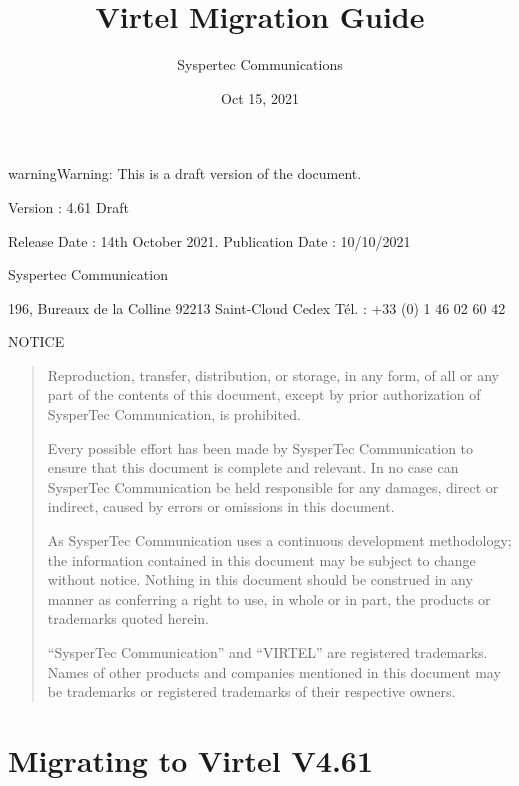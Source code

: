 \documentclass[letterpaper,10pt,english]{sphinxmanual}
\title{Virtel Migration Guide}
\date{Oct 15, 2021}
\author{Syspertec Communications}
\begin{document}
\pagestyle{empty}
\sphinxmaketitle
\pagestyle{plain}
\sphinxtableofcontents
\pagestyle{normal}
\label{\detokenize{Migration_Guide::doc}}



\begin{sphinxadmonition}{warning}{Warning:}
This is a draft version of the document.
\end{sphinxadmonition}

Version : 4.61 Draft

Release Date : 14th October 2021. Publication Date : 10/10/2021

Syspertec Communication

196, Bureaux de la Colline 92213 Saint-Cloud Cedex Tél. : +33 (0) 1 46 02 60 42


NOTICE
\begin{quote}

Reproduction, transfer, distribution, or storage, in any form, of all or any part of
the contents of this document, except by prior authorization of SysperTec
Communication, is prohibited.

Every possible effort has been made by SysperTec Communication to ensure that this document
is complete and relevant. In no case can SysperTec Communication be held responsible for
any damages, direct or indirect, caused by errors or omissions in this document.

As SysperTec Communication uses a continuous development methodology; the information
contained in this document may be subject to change without notice. Nothing in this
document should be construed in any manner as conferring a right to use, in whole or in
part, the products or trademarks quoted herein.

“SysperTec Communication” and “VIRTEL” are registered trademarks. Names of other products
and companies mentioned in this document may be trademarks or registered trademarks of
their respective owners.
\end{quote}

\newpage

\ignorespaces 

\chapter{Migrating to Virtel V4.61}
\label{\detokenize{Migration_Guide:migrating-to-virtel-v4-61}}\label{\detokenize{Migration_Guide:v461mi-introduction}}\label{\detokenize{Migration_Guide:index-0}}
\end{document}
